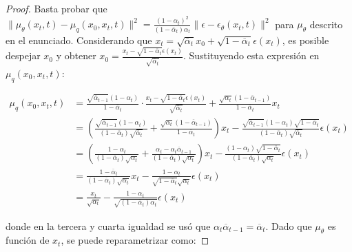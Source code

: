 \begin{proof}
    Basta probar que $\| \mu_\theta(x_t,t) - \mu_q(x_0,x_t,t) \|^2 = \frac{(1-\alpha_t)^2}{(1-\bar\alpha_t)\alpha_t} \| \epsilon - \epsilon_\theta(x_t,t) \|^2$ para $\mu_\theta$ descrito en el enunciado. Considerando que $x_t = \sqrt{\overline{\alpha}_t}x_0 + \sqrt{1-\overline{\alpha}_t}\epsilon(x_t)$, es posible despejar $x_0$ y obtener $x_0 = \frac{x_t - \sqrt{1-\overline{\alpha}_t}\epsilon(x_t)}{\sqrt{\overline{\alpha}_t}}$. Sustituyendo esta expresión en $\mu_q(x_0,x_t,t)$:

    \begin{align*}
        \mu_q(x_0,x_t,t) & = \frac{\sqrt{\overline{\alpha}_{t-1}}(1-\alpha_t)}{1-\overline{\alpha}_t}\cdot\frac{x_t - \sqrt{1-\overline{\alpha}_t}\epsilon(x_t)}{\sqrt{\overline{\alpha}_t}} + \frac{\sqrt{\alpha_t}(1-\overline{\alpha}_{t-1})}{1-\overline{\alpha}_t}x_t \\
                         & = \left(\frac{\sqrt{\overline{\alpha}_{t-1}}(1-\alpha_t)}{(1-\overline{\alpha}_t)\sqrt{\overline{\alpha}_t}} + \frac{\sqrt{\alpha_t}(1-\overline{\alpha}_{t-1})}{1-\overline{\alpha}_t}\right) x_t
        -\frac{\sqrt{\overline{\alpha}_{t-1}}(1-\alpha_t)\sqrt{1-\overline{\alpha}_t}}{(1-\overline{\alpha}_t)\sqrt{\overline{\alpha}_t}}\epsilon(x_t)                                                                                                                     \\
                         & = \left(\frac{1-\alpha_t}{(1-\overline{\alpha}_t)\sqrt{\alpha_t}} + \frac{\alpha_t - \alpha_t\overline{\alpha}_{t-1}}{(1-\overline{\alpha}_t)\sqrt{\alpha_t}}
        \right)x_t - \frac{(1-\alpha_t)\sqrt{1-\overline{\alpha}_t}}{(1-\overline{\alpha}_t)\sqrt{\alpha_t}}\epsilon(x_t)                                                                                                                                                  \\
                         & =\frac{1-\overline{\alpha}_t}{(1-\overline{\alpha}_t)\sqrt{\alpha_t}}x_t - \frac{1-\alpha_t}{\sqrt{1-\overline{\alpha}_t}\sqrt{\alpha_t}}\epsilon(x_t)                                                                                          \\
                         & =\frac{x_t}{\sqrt{\alpha_t}} - \frac{1-\alpha_t}{\sqrt{(1-\overline{\alpha}_t)\alpha_t}}\epsilon(x_t)
    \end{align*}

    donde en la tercera y cuarta igualdad se usó que $\alpha_t\overline{\alpha}_{t-1} = \overline{\alpha}_t$. Dado que $\mu_\theta$ es función de $x_t$, se puede reparametrizar como:


\end{proof}
